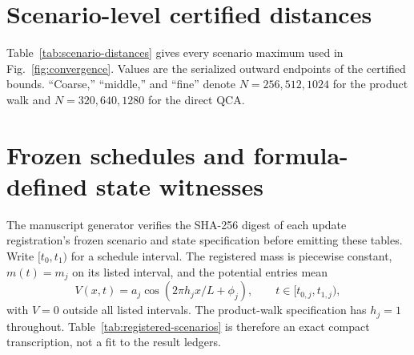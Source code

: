 \appendix

\section{Scenario-level certified distances}
\label{app:scenario-distances}

Table~\ref{tab:scenario-distances} gives every scenario maximum used in
Fig.~\ref{fig:convergence}.  Values are the serialized outward endpoints of the
certified bounds.  ``Coarse,'' ``middle,'' and ``fine'' denote
$N=256,512,1024$ for the product walk and $N=320,640,1280$ for the direct QCA.

\begin{table}[htbp]
  \centering
  \caption{All registered scenario-level certified-distance upper bounds.}
  \label{tab:scenario-distances}
  \small
  
\end{table}

\section{Frozen schedules and formula-defined state witnesses}
\label{app:registered-inputs}

The manuscript generator verifies the SHA-256 digest of each update
registration's frozen scenario and state specification before emitting these tables.  Write
$[t_0,t_1)$ for a schedule interval.  The registered mass is piecewise
constant, $m(t)=m_j$ on its listed interval, and the potential entries mean
\begin{equation}
  V(x,t)=a_j\cos\!\left(2\pi h_j x/L+\phi_j\right),
  \qquad t\in[t_{0,j},t_{1,j}),
  \label{eq:registered-potential}
\end{equation}
with $V=0$ outside all listed intervals.  The product-walk specification has
$h_j=1$ throughout.  Table~\ref{tab:registered-scenarios} is therefore an
exact compact transcription, not a fit to the result ledgers.

\begin{table}[htbp]
  \centering
  \caption{Exact frozen mass and potential schedules.  PW denotes the product
  walk; DQCA denotes the direct symmetry QCA.}
  \label{tab:registered-scenarios}
  \scriptsize
  \setlength{\tabcolsep}{3pt}
  
\end{table}

